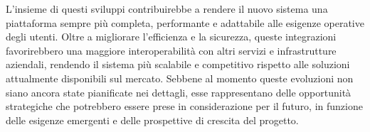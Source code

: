 L’insieme di questi sviluppi contribuirebbe a rendere il nuovo sistema una piattaforma sempre più completa, performante e adattabile alle esigenze operative degli utenti. Oltre a migliorare l’efficienza e la sicurezza, queste integrazioni favorirebbero una maggiore interoperabilità con altri servizi e infrastrutture aziendali, rendendo il sistema più scalabile e competitivo rispetto alle soluzioni attualmente disponibili sul mercato. Sebbene al momento queste evoluzioni non siano ancora state pianificate nei dettagli, esse rappresentano delle opportunità strategiche che potrebbero essere prese in considerazione per il futuro, in funzione delle esigenze emergenti e delle prospettive di crescita del progetto.

